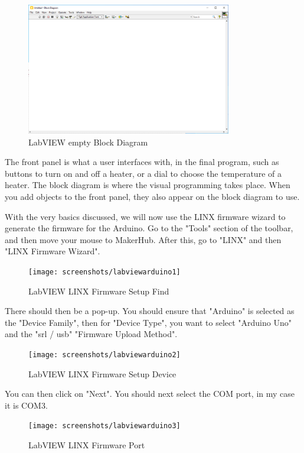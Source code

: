 \documentclass[a4paper,11pt]{report}
\begin{document}
\begin{figure}[H]
\centering
\includegraphics[width=0.8\textwidth]{screenshots/labview4}
\caption{LabVIEW empty Block Diagram}
\end{figure}

The front panel is what a user interfaces with, in the final program, such as buttons to turn on and off a heater, or a dial to choose the temperature of a heater. The block diagram is where the visual programming takes place. When you add objects to the front panel, they also appear on the block diagram to use.

With the very basics discussed, we will now use the LINX firmware wizard to generate the firmware for the Arduino. Go to the "Tools" section of the toolbar, and then move your mouse to MakerHub. After this, go to "LINX" and then "LINX Firmware Wizard".

\begin{figure}[H]
\centering
\texttt{[image: screenshots/labviewarduino1]}
\caption{LabVIEW LINX Firmware Setup Find}
\end{figure}

There should then be a pop-up. You should ensure that "Arduino" is selected as the "Device Family", then for "Device Type", you want to select "Arduino Uno" and the "\gls{srl} / \gls{usb}" "Firmware Upload Method".

\begin{figure}[H]
\centering
\texttt{[image: screenshots/labviewarduino2]}
\caption{LabVIEW LINX Firmware Setup Device}
\end{figure}

You can then click on "Next". You should next select the COM port, in my case it is COM3.
\begin{figure}[H]

\centering
\texttt{[image: screenshots/labviewarduino3]}
\caption{LabVIEW LINX Firmware Port}
\end{figure}
\end{document}
